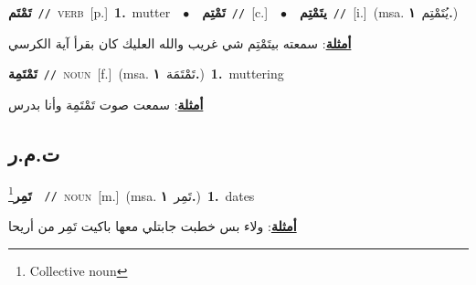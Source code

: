 \documentclass[10pt,a4paper,twoside]{article} %
\begin{document}
\begin{multicols}{2}
{\setlength\topsep{0pt}\textbf{\foreignlanguage{arabic}{تَمْتَم}}\ {\color{gray}\texttt{//}\color{black}}\ \textsc{verb}\ [p.]\ \textbf{1.}~mutter\ \ $\bullet$\ \ \setlength\topsep{0pt}\textbf{\foreignlanguage{arabic}{تَمْتِم}}\ {\color{gray}\texttt{//}\color{black}}\ [c.]\ \ $\bullet$\ \ \setlength\topsep{0pt}\textbf{\foreignlanguage{arabic}{يتَمْتِم}}\ {\color{gray}\texttt{//}\color{black}}\ [i.]\ \color{gray}(msa. \foreignlanguage{arabic}{يُتَمْتِم}~\foreignlanguage{arabic}{\textbf{١.}})\color{black}\  \begin{flushright}\color{gray}\foreignlanguage{arabic}{\textbf{\underline{\foreignlanguage{arabic}{أمثلة}}}: سمعته بيتَمْتِم شي غريب والله العليك كان بقرأ آية الكرسي}\end{flushright}\color{black}} \vspace{2mm}

{\setlength\topsep{0pt}\textbf{\foreignlanguage{arabic}{تَمْتَمِة}}\ {\color{gray}\texttt{//}\color{black}}\ \textsc{noun}\ [f.]\ \color{gray}(msa. \foreignlanguage{arabic}{تَمْتَمَة}~\foreignlanguage{arabic}{\textbf{١.}})\color{black}\ \textbf{1.}~muttering\  \begin{flushright}\color{gray}\foreignlanguage{arabic}{\textbf{\underline{\foreignlanguage{arabic}{أمثلة}}}: سمعت صوت تَمْتَمِة وأنا بدرس}\end{flushright}\color{black}} \vspace{2mm}

\vspace{-3mm}
\subsection*{\color{blue}\foreignlanguage{arabic}{ت.م.ر}\color{blue}{}} 

{\setlength\topsep{0pt}\textbf{\foreignlanguage{arabic}{تَمِر}}\footnote{Collective noun}\ \ {\color{gray}\texttt{//}\color{black}}\ \textsc{noun}\ [m.]\ \color{gray}(msa. \foreignlanguage{arabic}{تَمِر}~\foreignlanguage{arabic}{\textbf{١.}})\color{black}\ \textbf{1.}~dates\  \begin{flushright}\color{gray}\foreignlanguage{arabic}{\textbf{\underline{\foreignlanguage{arabic}{أمثلة}}}: ولاء بس خطبت جابتلي معها باكيت تَمِر من أريحا}\end{flushright}\color{black}} \vspace{2mm}


\end{multicols}
\end{document}

